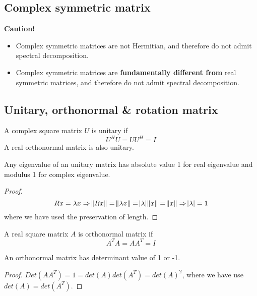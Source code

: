 \begin{refsection}
\subsection{Complex symmetric matrix}
\begin{mdframed}
\textbf{Caution!}\\
\begin{itemize}
    \item Complex symmetric matrices are not Hermitian, and therefore do not admit spectral decomposition.
    \item Complex symmetric matrices are \textbf{fundamentally different from} real symmetric matrices, and therefore do not admit spectral decomposition.
\end{itemize}


\end{mdframed}

\subsection{Unitary, orthonormal \& rotation matrix}
\begin{definition}
A complex square matrix $U$ is unitary if
$$U^HU=UU^H = I$$
A real orthonormal matrix is also unitary. 
\end{definition}

\begin{theorem}
Any eigenvalue of an unitary matrix has absolute value 1 for real eigenvalue and modulus 1 for complex eigenvalue.
\end{theorem}
\begin{proof}
$$Rx = \lambda x \Rightarrow \norm{Rx} = \norm{\lambda x} = \abs{\lambda}\norm{x} = \norm{x} \Rightarrow \abs{\lambda} = 1$$
where we have used the preservation of length.
\end{proof}



\begin{definition}
A real square matrix $A$  is orthonormal matrix if
$$A^TA = AA^T = I$$
\end{definition}


\begin{lemma}
An orthonormal matrix has determinant value of 1 or -1.
\end{lemma}
\begin{proof}
$Det(AA^T) = 1 = det(A)det(A^T)=det(A)^2$, where we have use $det(A)=det(A^T)$.	
\end{proof}



\end{refsection}
